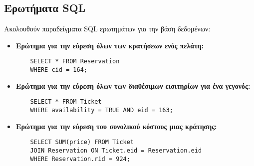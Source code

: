 \documentclass{article}
\begin{document}
\subsection*{Ερωτήματα SQL}
Ακολουθούν παραδείγματα SQL ερωτημάτων για την βάση δεδομένων:
\begin{itemize}
    \item \textbf{Ερώτημα για την εύρεση όλων των κρατήσεων ενός πελάτη:}
    \begin{lstlisting}
    SELECT * FROM Reservation
    WHERE cid = 164; 
    \end{lstlisting}
    \item \textbf{Ερώτημα για την εύρεση όλων των διαθέσιμων εισιτηρίων για ένα γεγονός:}
    \begin{lstlisting}
    SELECT * FROM Ticket
    WHERE availability = TRUE AND eid = 163;
    \end{lstlisting}
    \item \textbf{Ερώτημα για την εύρεση του συνολικού κόστους μιας κράτησης:}
    \begin{lstlisting}
    SELECT SUM(price) FROM Ticket
    JOIN Reservation ON Ticket.eid = Reservation.eid
    WHERE Reservation.rid = 924;
    \end{lstlisting}
\end{itemize}
\end{document}

